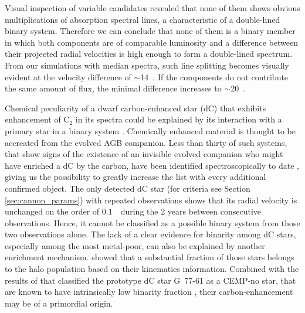 Visual inspection of variable candidates revealed that none of them shows obvious multiplications of absorption spectral lines, a characteristic of a double-lined binary system. Therefore we can conclude that none of them is a binary member in which both components are of comparable luminosity and a difference between their projected radial velocities is high enough to form a double-lined spectrum. From our simulations with median spectra, such line splitting becomes visually evident at the velocity difference of $\sim$14~\kms. If the components do not contribute the same amount of flux, the minimal difference increases to $\sim$20~\kms.

Chemical peculiarity of a dwarf carbon-enhanced star (dC) that exhibits enhancement of C$_2$ in its spectra could be explained by its interaction with a primary star in a binary system \citep{2018ApJ...856L...2M}. Chemically enhanced material is thought to be accreated from the evolved AGB companion. Less than thirty of such systems, that show signs of the existence of an invisible evolved companion who might have enriched a dC by the carbon, have been identified spectroscopically to date \citep{1986ApJ...300..314D, 2018ApJ...856L...2M, 2018MNRAS.479.3873W}, giving us the possibility to greatly increase the list with every additional confirmed object. The only detected dC star (for criteria see Section \ref{sec:cannon_params}) with repeated observations shows that its radial velocity is unchanged on the order of $0.1$~\kms\ during the 2 years between consecutive observations. Hence, it cannot be classified as a possible binary system from those two observations alone. The lack of a clear evidence for binarity among dC stars, especially among the most metal-poor, can also be explained by another enrichment mechanism. \citet{2018MNRAS.477.3801F} showed that a substantial fraction of those stars belongs to the halo population based on their kinematics information. Combined with the results of \citet{2016ApJ...833...20Y} that classified the prototype dC star \mbox{G 77-61} as a CEMP-no star, that are known to have intrinsically low binarity fraction \citep{2014MNRAS.441.1217S, 2016A&A...586A.160H}, their carbon-enhancement may be of a primordial origin.

